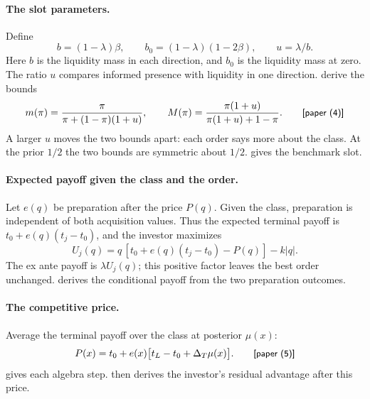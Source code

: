 \paragraph{The slot parameters.} Define
\[
b=(1-\lambda)\beta,\qquad b_0=(1-\lambda)(1-2\beta),\qquad u=\lambda/b.
\]
Here \(b\) is the liquidity mass in each direction, and \(b_0\) is the liquidity mass at zero.
The ratio \(u\) compares informed presence with liquidity in one direction.
 derive the bounds
\[
m(\pi)=\frac{\pi}{\pi+(1-\pi)(1+u)},\qquad
M(\pi)=\frac{\pi(1+u)}{\pi(1+u)+1-\pi}.\tag*{\paper{(4)}}
\]
A larger \(u\) moves the two bounds apart: each order says more about the class.
At the prior \(1/2\) the two bounds are symmetric about \(1/2\).
 gives the benchmark slot.

\paragraph{Expected payoff given the class and the order.}
Let \(e(q)\) be preparation after the price \(P(q)\).
Given the class, preparation is independent of both acquisition values.
Thus the expected terminal payoff is \(t_0+e(q)(t_j-t_0)\), and the investor maximizes
\[
U_j(q)=q\,[t_0+e(q)(t_j-t_0)-P(q)]-k|q|.
\]
The ex ante payoff is \(\lambda U_j(q)\); this positive factor leaves the best order unchanged.
 derives the conditional payoff from the two preparation outcomes.

\paragraph{The competitive price.} Average the terminal payoff over the class at posterior \(\mu(x)\):
\[
P(x)=t_0+e(x)\bigl[t_L-t_0+\DT\mu(x)\bigr].\tag*{\paper{(5)}}
\]
 gives each algebra step.
 then derives the investor's residual advantage after this price.

